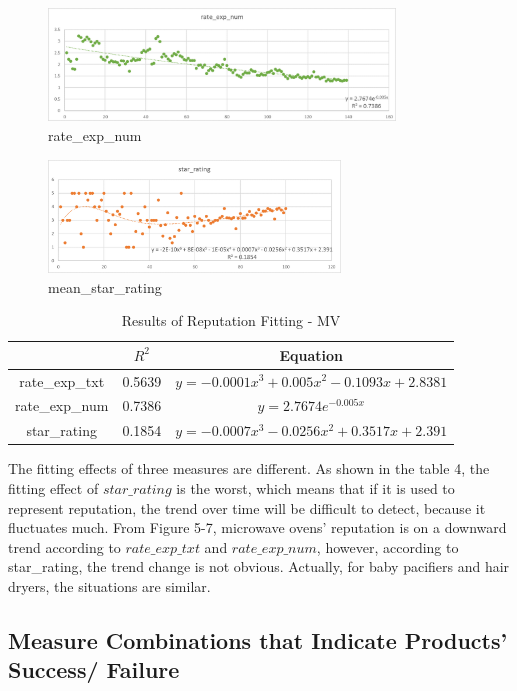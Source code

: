 \documentclass{mcmthesis}
\begin{document}
\begin{figure}[H]
\centering
\includegraphics[width=.85\textwidth,height=3cm]{figures/c.png}
\caption{rate\_exp\_num }
\end{figure}

\begin{figure}[H]
\centering
\includegraphics[width=.85\textwidth,height=3cm]{figures/d.png}
\caption{mean\_star\_rating}
\end{figure}

\begin{longtable}[c]{ccc}
\caption{Results of Reputation Fitting - MV}\\
\toprule
 & $R^2$ & Equation \\
\midrule
\endhead
\bottomrule
\endfoot
rate\_exp\_txt & 0.5639 & 
$y= −0.0001x^3+ 0.005x^2 -0.1093x+ 2.8381$ \\
rate\_exp\_num & 0.7386 & $y= 2.7674e^{−0.005x}$ \\
star\_rating & 0.1854 & $y=−0.0007x^3- 0.0256x^2+ 0.3517x+ 2.391$\\
\end{longtable}

The fitting effects of three measures are different. As shown in the table 4, the fitting effect of $star\_rating$ is the worst, which means that if it is used to represent reputation,  the trend over time will be difficult to detect, because it fluctuates much. From Figure 5-7, microwave ovens' reputation is on a downward trend according to $rate\_exp\_txt$ and $rate\_exp\_num$, however, according to star\_rating, the trend change is not obvious. Actually, for baby pacifiers and hair dryers, the situations are similar.

\subsection{Measure Combinations that Indicate Products' Success/ Failure}
\end{document}
